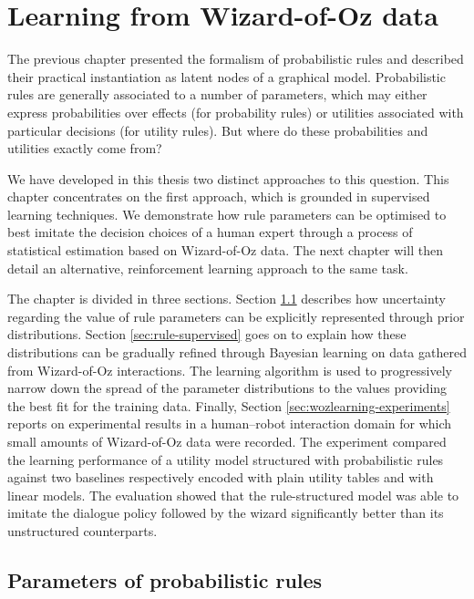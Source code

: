
\chapter{Learning from Wizard-of-Oz data}
\label{chap:wozlearning}

The previous chapter presented the formalism of probabilistic rules and described their practical instantiation as latent nodes of a graphical model. Probabilistic rules are generally associated to a number of parameters, which may either express probabilities over effects (for probability rules) or utilities associated with particular decisions (for utility rules). But where do these probabilities and utilities exactly come from?

We have developed in this thesis two distinct approaches to this question. This chapter concentrates on the first approach, which is grounded in supervised learning techniques. We demonstrate how rule parameters can be optimised to best imitate the decision choices of a human expert through a process of statistical estimation based on Wizard-of-Oz data. The next chapter will then detail an alternative, reinforcement learning approach to the same task.

The chapter is divided in three sections.  Section \ref{sec:rule-params} describes how uncertainty regarding the value of rule parameters can be explicitly represented through prior distributions. Section \ref{sec:rule-supervised} goes on to explain how these distributions can be gradually refined through Bayesian learning on data gathered from Wizard-of-Oz interactions.  The learning algorithm  is used to progressively narrow down the spread of the parameter distributions to the values providing the best fit for the training data. Finally, Section \ref{sec:wozlearning-experiments} reports on experimental results in a human--robot interaction domain for which small amounts of Wizard-of-Oz data were recorded. The experiment compared the learning performance of a utility model structured with probabilistic rules against two baselines respectively encoded with plain utility tables and with linear models. The evaluation showed that the rule-structured model was able to imitate the dialogue policy followed by the wizard significantly better than its unstructured counterparts.

\section{Parameters of probabilistic rules}
\label{sec:rule-params}

